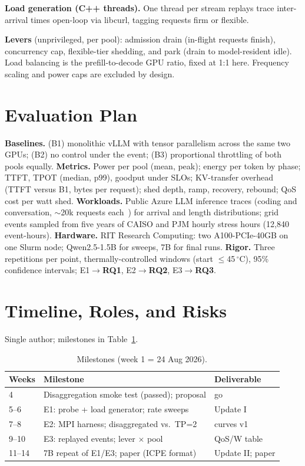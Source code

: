 \documentclass[conference,10pt]{IEEEtran}
\newcommand{\RQ}[1]{\textbf{RQ#1}}
\begin{document}
\textbf{Load generation (C++ threads).} One thread per stream replays trace inter-arrival times open-loop via libcurl, tagging requests firm or flexible.

\textbf{Levers} (unprivileged, per pool): admission drain (in-flight requests finish), concurrency cap, flexible-tier shedding, and park (drain to model-resident idle). Load balancing is the prefill-to-decode GPU ratio, fixed at 1:1 here. Frequency scaling and power caps are excluded by design.

\section{Evaluation Plan}
\textbf{Baselines.} (B1) monolithic vLLM with tensor parallelism across the same two GPUs; (B2) no control under the event; (B3) proportional throttling of both pools equally.
\textbf{Metrics.} Power per pool (mean, peak); energy per token by phase; TTFT, TPOT (median, p99), goodput under SLOs; KV-transfer overhead (TTFT versus B1, bytes per request); shed depth, ramp, recovery, rebound; QoS cost per watt shed.
\textbf{Workloads.} Public Azure LLM inference traces (coding and conversation, $\sim$20k requests each~\cite{patel2024splitwise}) for arrival and length distributions; grid events sampled from five years of CAISO and PJM hourly stress hours (12{,}840 event-hours).
\textbf{Hardware.} RIT Research Computing: two A100-PCIe-40GB on one Slurm node; Qwen2.5-1.5B for sweeps, 7B for final runs.
\textbf{Rigor.} Three repetitions per point, thermally-controlled windows (start $\leq$45\,$^\circ$C), 95\% confidence intervals; E1$\rightarrow$\RQ{1}, E2$\rightarrow$\RQ{2}, E3$\rightarrow$\RQ{3}.

\section{Timeline, Roles, and Risks}
Single author; milestones in Table~\ref{tab:timeline}.
\begin{table}[h]
\centering\footnotesize
\begin{tabular}{@{}lll@{}}
\toprule
Weeks & Milestone & Deliverable\\
\midrule
4 & Disaggregation smoke test (passed); proposal & go\\
5--6 & E1: probe + load generator; rate sweeps & Update I\\
7--8 & E2: MPI harness; disaggregated vs.\ TP=2 & curves v1\\
9--10 & E3: replayed events; lever $\times$ pool & QoS/W table\\
11--14 & 7B repeat of E1/E3; paper (ICPE format) & Update II; paper\\
\bottomrule
\end{tabular}
\caption{Milestones (week 1 = 24 Aug 2026).}\label{tab:timeline}
\end{table}
\end{document}
